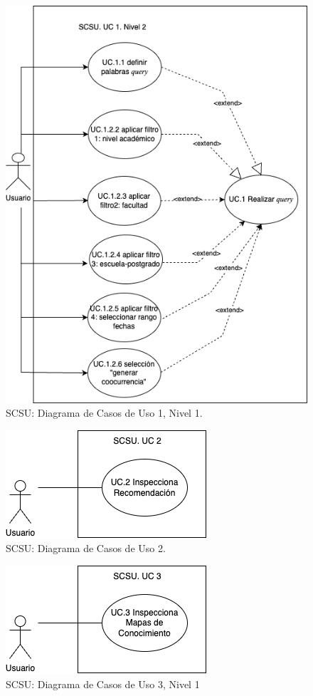 \documentclass[
  12pt,
  openany]{book}
\begin{document}
\begin{figure}

{\centering \includegraphics[width=0.5\linewidth]{images/05-desarrollo/4_ciclo/UC/SCSU_UC1_nivel2} 

}

\caption{SCSU: Diagrama de Casos de Uso 1, Nivel 1.}\label{fig:uc12}
\end{figure}

\begin{figure}

{\centering \includegraphics[width=0.4\linewidth]{images/05-desarrollo/4_ciclo/UC/SCSU_UC2_nivel1} 

}

\caption{SCSU: Diagrama de Casos de Uso 2.}\label{fig:uc2}
\end{figure}

\begin{figure}

{\centering \includegraphics[width=0.4\linewidth]{images/05-desarrollo/4_ciclo/UC/SCSU_UC3_nivel1} 

}

\caption{SCSU: Diagrama de Casos de Uso 3, Nivel 1}\label{fig:uc3}
\end{figure}
\end{document}
